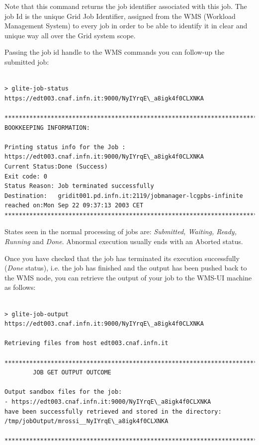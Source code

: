 Note that this command returns the job identifier associated with this job. The job Id 
is the unique Grid Job Identifier, assigned from the WMS (Workload Management System) to every job in order to 
be able to identify it in clear and unique way all over the Grid system scope.

Passing the job id handle to the WMS commands you can follow-up the submitted job:

\smallskip
\begin{scriptsize}
\begin{verbatim}

> glite-job-status https://edt003.cnaf.infn.it:9000/NyIYrqE\_a8igk4f0CLXNKA

****************************************************************************
BOOKKEEPING INFORMATION:

Printing status info for the Job :
https://edt003.cnaf.infn.it:9000/NyIYrqE\_a8igk4f0CLXNKA
Current Status:Done (Success)
Exit code: 0
Status Reason: Job terminated successfully
Destination:   gridit001.pd.infn.it:2119/jobmanager-lcgpbs-infinite
reached on:Mon Sep 22 09:37:13 2003 CET
****************************************************************************
\end{verbatim}
\end{scriptsize}
\smallskip

States seen in the normal processing of jobs are: \textit{Submitted, Waiting, Ready, Running} and \textit{Done}. Abnormal 
execution usually ends with an Aborted status.

Once you have checked that the job has terminated its execution successfully (\emph{Done} status), i.e. the job has 
finished and the output has been pushed back to the WMS node, you can retrieve the output of your job to the 
WMS-UI machine as follows:

\smallskip
\begin{scriptsize}
\begin{verbatim}

> glite-job-output https://edt003.cnaf.infn.it:9000/NyIYrqE\_a8igk4f0CLXNKA

Retrieving files from host edt003.cnaf.infn.it

****************************************************************************
		JOB GET OUTPUT OUTCOME

Output sandbox files for the job:
- https://edt003.cnaf.infn.it:9000/NyIYrqE\_a8igk4f0CLXNKA
have been successfully retrieved and stored in the directory:
/tmp/jobOutput/mrossi__NyIYrqE\_a8igk4f0CLXNKA

****************************************************************************
\end{verbatim}
\end{scriptsize}
\smallskip

